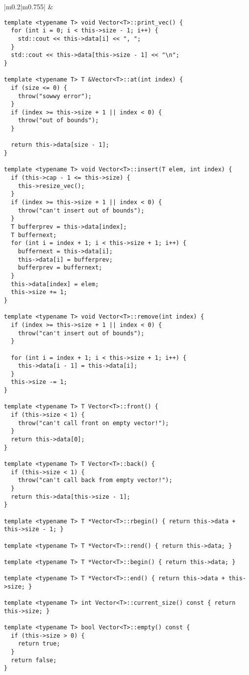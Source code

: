 \documentclass[main.tex,fontsize=8pt,paper=a4,paper=portrait,DIV=calc]{scrartcl}
\begin{document}
\begin{table}[ht!]
\begin{tabular}{|m{0.2\linewidth}|m{0.755\linewidth}|}
\hline
& 
\begin{lstlisting}
template <typename T> void Vector<T>::print_vec() {
  for (int i = 0; i < this->size - 1; i++) {
    std::cout << this->data[i] << ", ";
  }
  std::cout << this->data[this->size - 1] << "\n";
}

template <typename T> T &Vector<T>::at(int index) {
  if (size <= 0) {
    throw("sowwy error");
  }
  if (index >= this->size + 1 || index < 0) {
    throw("out of bounds");
  }

  return this->data[size - 1];
}

template <typename T> void Vector<T>::insert(T elem, int index) {
  if (this->cap - 1 <= this->size) {
    this->resize_vec();
  }
  if (index >= this->size + 1 || index < 0) {
    throw("can't insert out of bounds");
  }
  T bufferprev = this->data[index];
  T buffernext;
  for (int i = index + 1; i < this->size + 1; i++) {
    buffernext = this->data[i];
    this->data[i] = bufferprev;
    bufferprev = buffernext;
  }
  this->data[index] = elem;
  this->size += 1;
}

template <typename T> void Vector<T>::remove(int index) {
  if (index >= this->size + 1 || index < 0) {
    throw("can't insert out of bounds");
  }

  for (int i = index + 1; i < this->size + 1; i++) {
    this->data[i - 1] = this->data[i];
  }
  this->size -= 1;
}

template <typename T> T Vector<T>::front() {
  if (this->size < 1) {
    throw("can't call front on empty vector!");
  }
  return this->data[0];
}

template <typename T> T Vector<T>::back() {
  if (this->size < 1) {
    throw("can't call back from empty vector!");
  }
  return this->data[this->size - 1];
}

template <typename T> T *Vector<T>::rbegin() { return this->data + this->size - 1; }

template <typename T> T *Vector<T>::rend() { return this->data; }

template <typename T> T *Vector<T>::begin() { return this->data; }

template <typename T> T *Vector<T>::end() { return this->data + this->size; }

template <typename T> int Vector<T>::current_size() const { return this->size; }

template <typename T> bool Vector<T>::empty() const {
  if (this->size > 0) {
    return true;
  }
  return false;
}
\end{lstlisting}
\\
\hline
\end{tabular}
\end{table}
\end{document}

